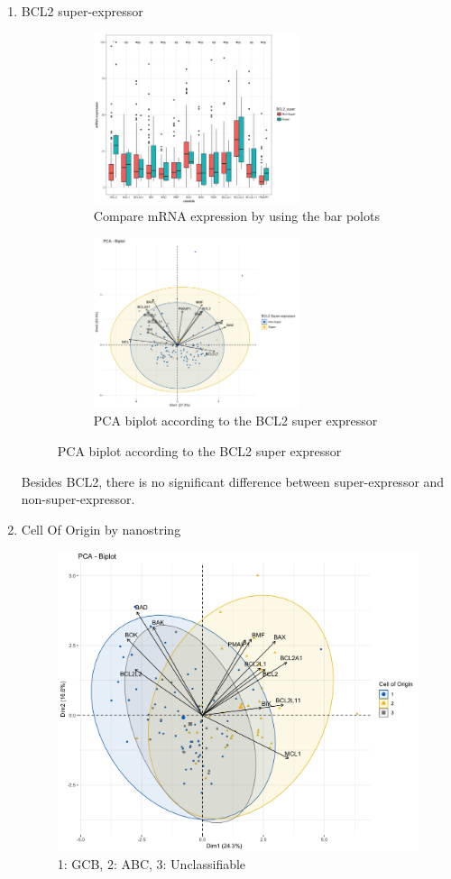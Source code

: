 \documentclass{article}
\begin{document}
\begin{enumerate}
    \item BCL2 super-expressor
    
    \begin{figure}[H]
        \begin{subfigure}{0.5\textwidth}
        \includegraphics[width = 0.9\linewidth, height = 5cm]{Image/BCL2_Super_group.jpg}
        \caption{Compare mRNA expression by using the bar polots}
        \end{subfigure}
        \begin{subfigure}{0.5\textwidth}
        \includegraphics[width = 0.9\linewidth, height = 5cm]{Image/Super_PCA_biplot.jpg}
        \caption{PCA biplot according to the BCL2 super expressor}
        \end{subfigure}
    \end{figure}
    
    Besides BCL2, there is no significant difference between super-expressor and non-super-expressor.\\
    
    \item Cell Of Origin by nanostring
    
    \begin{figure}[H]
    \includegraphics[width = 0.8\linewidth]{Image/COO_PCA_biplot.jpg}
    \caption{1: GCB, 2: ABC, 3: Unclassifiable}
    \end{figure}
    

\end{enumerate}
\end{document}
